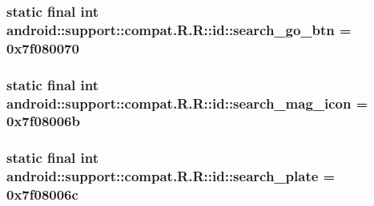\hypertarget{classandroid_1_1support_1_1compat_1_1_r_1_1id_1d4e616632a4ea15800ae3d8eaa359dc}{
\subsubsection[{search\_\-go\_\-btn}]{\setlength{\rightskip}{0pt plus 5cm}static final int android::support::compat.R.R::id::search\_\-go\_\-btn = 0x7f080070}}
\label{classandroid_1_1support_1_1compat_1_1_r_1_1id_1d4e616632a4ea15800ae3d8eaa359dc}


\hypertarget{classandroid_1_1support_1_1compat_1_1_r_1_1id_e6bac0e1f5909bbfd83c0da28e03e269}{
\subsubsection[{search\_\-mag\_\-icon}]{\setlength{\rightskip}{0pt plus 5cm}static final int android::support::compat.R.R::id::search\_\-mag\_\-icon = 0x7f08006b}}
\label{classandroid_1_1support_1_1compat_1_1_r_1_1id_e6bac0e1f5909bbfd83c0da28e03e269}


\hypertarget{classandroid_1_1support_1_1compat_1_1_r_1_1id_8ac998f014bf3ba7ffd10c6f2d5876c4}{
\subsubsection[{search\_\-plate}]{\setlength{\rightskip}{0pt plus 5cm}static final int android::support::compat.R.R::id::search\_\-plate = 0x7f08006c}}
\label{classandroid_1_1support_1_1compat_1_1_r_1_1id_8ac998f014bf3ba7ffd10c6f2d5876c4}


